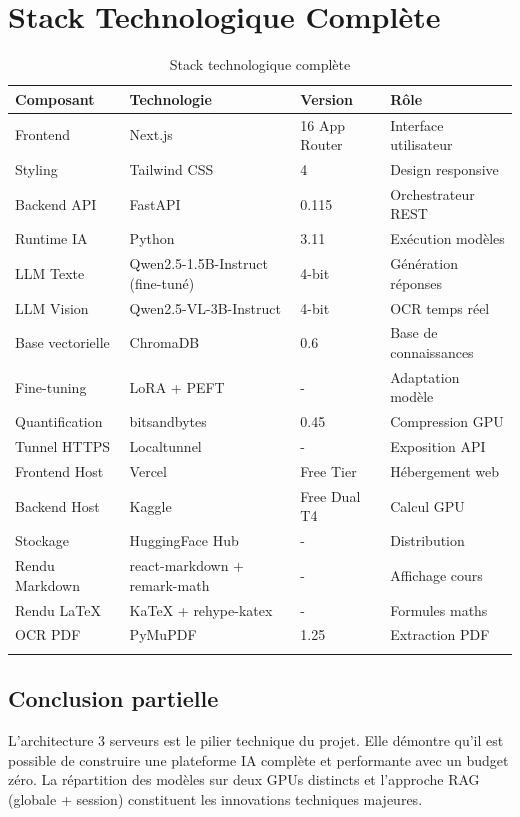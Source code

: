 \documentclass[12pt,a4paper]{report}
\begin{document}
\section{Stack Technologique Complète}

\begin{longtable}{p{3.5cm} p{4cm} p{2cm} p{4.5cm}}
    \toprule
    \textbf{Composant} & \textbf{Technologie} & \textbf{Version} & \textbf{Rôle} \\
    \midrule
    \endhead
    Frontend & Next.js & 16 App Router & Interface utilisateur \\
    Styling & Tailwind CSS & 4 & Design responsive \\
    Backend API & FastAPI & 0.115 & Orchestrateur REST \\
    Runtime IA & Python & 3.11 & Exécution modèles \\
    LLM Texte & Qwen2.5-1.5B-Instruct (fine-tuné) & 4-bit & Génération réponses \\
    LLM Vision & Qwen2.5-VL-3B-Instruct & 4-bit & OCR temps réel \\
    Base vectorielle & ChromaDB & 0.6 & Base de connaissances \\
    Fine-tuning & LoRA + PEFT & - & Adaptation modèle \\
    Quantification & bitsandbytes & 0.45 & Compression GPU \\
    Tunnel HTTPS & Localtunnel & - & Exposition API \\
    Frontend Host & Vercel & Free Tier & Hébergement web \\
    Backend Host & Kaggle & Free Dual T4 & Calcul GPU \\
    Stockage & HuggingFace Hub & - & Distribution \\
    Rendu Markdown & react-markdown + remark-math & - & Affichage cours \\
    Rendu LaTeX & KaTeX + rehype-katex & - & Formules maths \\
    OCR PDF & PyMuPDF & 1.25 & Extraction PDF \\
    \bottomrule
    \caption{Stack technologique complète}
\end{longtable}

\subsection*{Conclusion partielle}
L'architecture 3 serveurs est le pilier technique du projet. Elle démontre qu'il est possible de construire une plateforme IA complète et performante avec un budget zéro. La répartition des modèles sur deux GPUs distincts et l'approche RAG (globale + session) constituent les innovations techniques majeures.
\end{document}
